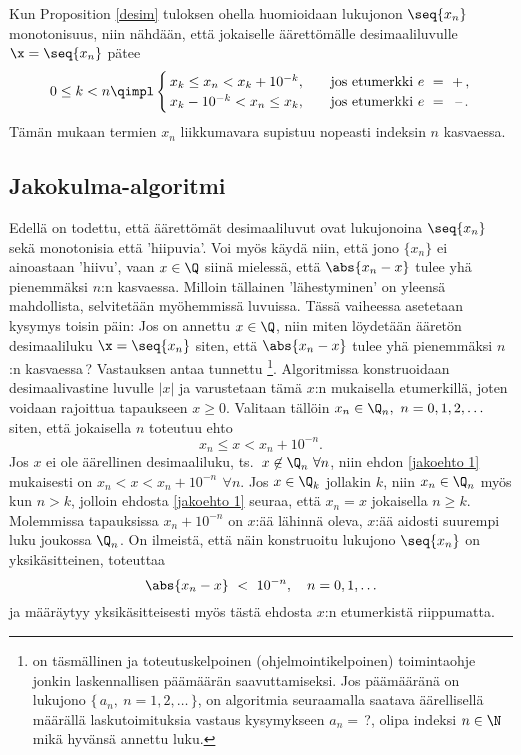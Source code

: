 Kun Proposition \ref{desim} tuloksen ohella huomioidaan lukujonon $\seq{x_n}$ monotonisuus, niin
nähdään, että jokaiselle äärettömälle desimaaliluvulle $\x=\seq{x_n}$ pätee
\[
0 \le k < n \qimpl \begin{cases} 
                   \,x_k \le x_n < x_k + 10^{-k}, \quad &\text{jos etumerkki $e\ =\ +$}\,, \\
                   \,x_k - 10^{-k} < x_n \le x_k, \quad &\text{jos etumerkki $e\ =\,\ $ --}\,.
                   \end{cases}
\]
Tämän mukaan termien $x_n$ liikkumavara supistuu nopeasti indeksin $n$ kasvaessa.

\subsection{Jakokulma-algoritmi}
%

Edellä on todettu, että äärettömät desimaaliluvut ovat lukujonoina $\seq{x_n}$ sekä monotonisia
että 'hiipuvia'. Voi myös käydä niin, että jono $\{x_n\}$ ei ainoastaan 'hiivu', vaan 
 $x \in \Q$ siinä mielessä, että $\abs{x_n-x}$ tulee yhä 
pienemmäksi $n$:n kasvaessa. Milloin tällainen 'lähestyminen' on yleensä mahdollista, 
selvitetään myöhemmissä luvuissa. Tässä vaiheessa asetetaan kysymys toisin päin: Jos on annettu
$x\in\Q$, niin miten löydetään ääretön desimaaliluku $\x=\seq{x_n}$ siten, että $\abs{x_n-x}$ 
tulee yhä pienemmäksi $n$:n kasvaessa\,? Vastauksen antaa tunnettu 
\footnote[2]{ on täsmällinen ja toteutuskelpoinen
(ohjelmointikelpoinen) toimintaohje jonkin laskennallisen päämäärän saavuttamiseksi. Jos 
päämääränä on lukujono $\{\,a_n,\ n=1,2, \ldots\,\}$, on algoritmia seuraamalla saatava 
äärellisellä määrällä laskutoimituksia vastaus kysymykseen $a_n=\,$?, olipa indeksi $n \in \N$
mikä hyvänsä annettu luku. }. Algoritmissa konstruoidaan desimaalivastine
luvulle $|x|$ ja varustetaan tämä $x$:n mukaisella etumerkillä, joten voidaan rajoittua
tapaukseen $x \ge 0$. Valitaan tällöin $x_n\in\Q_n,\ n=0,1,2,\ldots$ siten, että jokaisella
$n$ toteutuu ehto
\begin{equation} \label{jakoehto 1}
x_n \le x < x_n + 10^{-n}.
\end{equation}
Jos $x$ ei ole äärellinen desimaaliluku, ts.\ $x\not\in\Q_n\ \forall n$, niin ehdon
\eqref{jakoehto 1} mukaisesti on $x_n < x < x_n+10^{-n}\,\ \forall n$. Jos $x\in\Q_k$
jollakin $k$, niin $x_n\in\Q_n$ myös kun $n>k$, jolloin ehdosta \eqref{jakoehto 1}
seuraa, että $x_n=x$ jokaisella $n \ge k$. Molemmissa tapauksissa $x_n+10^{-n}$ on $x$:ää
lähinnä oleva, $x$:ää aidosti suurempi luku joukossa $\Q_n$. On ilmeistä, että näin
konstruoitu lukujono $\seq{x_n}$ on yksikäsitteinen, toteuttaa
\begin{equation}  \label{jakoehto 2}
\abs{x_n - x}\ <\ 10^{-n}, \quad n=0,1, \ldots
\end{equation}
ja määräytyy yksikäsitteisesti myös tästä ehdosta $x$:n etumerkistä riippumatta.


